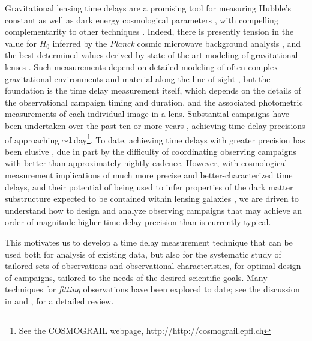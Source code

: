 \documentclass{emulateapj}
\begin{document}
Gravitational lensing time delays are a promising tool for measuring
Hubble's constant \citep[$H_0$;][]{Refsdal1964a} as well as dark
energy cosmological parameters \citep{Coe2009b,Linder2011a,Treu2013a},
with compelling complementarity to other techniques
\citep{Weinberg2013a, Linder2015a}.  Indeed, there is presently
tension in the value for $H_0$ inferred by the \emph{Planck} cosmic
microwave background analysis \citep{Planck-Collaboration2014a,
  Planck-Collaboration2015a}, and the best-determined values derived
by state of the art modeling of gravitational lenses
\citep[e.g.][]{Suyu2013a, Suyu2014a}.  Such measurements depend on
detailed modeling of often complex gravitational environments and
material along the line of sight \citep[e.g.][]{Greene2013a,
  Schneider2013a}, but the foundation is the time delay measurement
itself, which depends on the details of the observational campaign
timing and duration, and the associated photometric measurements of
each individual image in a lens. Substantial campaigns have been
undertaken over the past ten or more years
\citep[e.g.][]{Eigenbrod2005a, Tewes2013a}, achieving time delay
precisions of approaching $\sim1$\,day\footnote{See the COSMOGRAIL
  webpage, http://http://cosmograil.epfl.ch}.  To date, achieving time
delays with greater precision has been elusive
\citep[e.g.][]{Oguri2007a}, due in part by the difficulty of
coordinating observing campaigns with better than approximately
nightly cadence. However, with cosmological measurement implications
of much more precise and better-characterized time delays, and their
potential of being used to infer properties of the dark matter
substructure expected to be contained within lensing galaxies
\citep{Keeton2009a}, we are driven to understand how to design and
analyze observing campaigns that may achieve an order of magnitude
higher time delay precision than is currently typical. 

This motivates us to develop a time delay measurement technique that
can be used both for analysis of existing data, but also for the
systematic study of tailored sets of observations and observational
characteristics, for optimal design of campaigns, tailored to the
needs of the desired scientific goals. Many techniques for
\emph{fitting} observations have been explored to date; see the
discussion in \citet{Dobler2013a} and \citet{Liao2015a}, for a
detailed review.  

\end{document}
